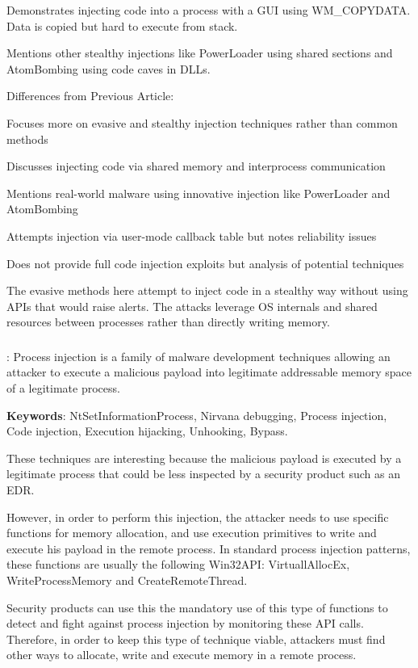 \documentclass{article}
\begin{document}
Demonstrates injecting code into a process with a GUI using WM\_COPYDATA. Data is copied but hard to execute from stack.

Mentions other stealthy injections like PowerLoader using shared sections and AtomBombing using code caves in DLLs.


Differences from Previous Article:

Focuses more on evasive and stealthy injection techniques rather than common methods

Discusses injecting code via shared memory and interprocess communication

Mentions real-world malware using innovative injection like PowerLoader and AtomBombing

Attempts injection via user-mode callback table but notes reliability issues

Does not provide full code injection exploits but analysis of potential techniques

The evasive methods here attempt to inject code in a stealthy way without using APIs that would raise alerts. The attacks leverage OS internals and shared resources between processes rather than directly writing memory.


\subsubsection{\textcite{Dequeker:2023}}
\textbf{}: Process injection is a family of malware development techniques allowing an attacker to execute a malicious payload into legitimate addressable memory space of a legitimate process.

\textbf{Keywords}: NtSetInformationProcess, Nirvana debugging, Process injection, Code injection, Execution hijacking, Unhooking, Bypass.

These techniques are interesting because the malicious payload is executed by a legitimate process that could be less inspected by a security product such as an EDR.

However, in order to perform this injection, the attacker needs to use specific functions for memory allocation, and use execution primitives to write and execute his payload in the remote process. In standard process injection patterns, these functions are usually the following Win32API: VirtuallAllocEx, WriteProcessMemory and CreateRemoteThread.
 
Security products can use this the mandatory use of this type of functions to detect and fight against process injection by monitoring these API calls. Therefore, in order to keep this type of technique viable, attackers must find other ways to allocate, write and execute memory in a remote process.
\end{document}

